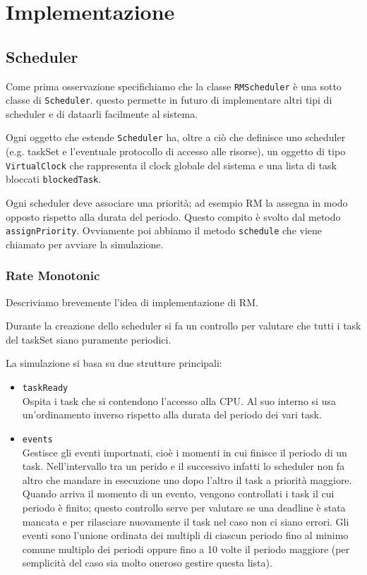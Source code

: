 \chapter{Implementazione}

\section{Scheduler}
Come prima osservazione specifichiamo che la classe \texttt{RMScheduler} è una sotto classe di \texttt{Scheduler}. questo permette in futuro di implementare altri tipi di scheduler e di dataarli facilmente al sistema.

Ogni oggetto che estende \texttt{Scheduler} ha, oltre a ciò che definisce uno scheduler (e.g. taskSet e l'eventuale protocollo di accesso alle risorse), un oggetto di tipo \texttt{VirtualClock} che rappresenta il clock globale del sistema e una lista di task bloccati \texttt{blockedTask}.

Ogni scheduler deve associare una priorità; ad esempio RM la assegna in modo opposto rispetto alla durata del periodo. Questo compito è svolto dal metodo \texttt{assignPriority}. Ovviamente poi abbiamo il metodo \texttt{schedule} che viene chiamato per avviare la simulazione.

\subsection{Rate Monotonic}
Descriviamo brevemente l'idea di implementazione di RM.

Durante la creazione dello scheduler si fa un controllo per valutare che tutti i task del taskSet siano puramente periodici.

\myskip

La simulazione si basa su due strutture principali:
\begin{itemize}
    \item \texttt{taskReady} \\
        Ospita i task che si contendono l'accesso alla CPU. Al suo interno si usa un'ordinamento inverso rispetto alla durata del periodo dei vari task.
    \item \texttt{events} \\
        Gestisce gli eventi importnati, cioè i momenti in cui finisce il periodo di un task. Nell'intervallo tra un perido e il successivo infatti lo scheduler non fa altro che mandare in esecuzione uno dopo l'altro il task a priorità maggiore. Quando arriva il momento di un evento, vengono controllati i task il cui periodo è finito; questo controllo serve per valutare se una deadline è stata mancata e per rilasciare nuovamente il task nel caso non ci siano errori. Gli eventi sono l’unione ordinata dei multipli di ciascun periodo fino al minimo comune multiplo dei periodi oppure fino a 10 volte il periodo maggiore (per semplicità del caso sia molto oneroso gestire questa lista).
\end{itemize}

